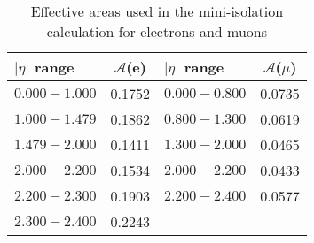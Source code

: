\begin{table}
 \begin{center}
   \small
   \begin{tabular}{lc|lc}
     $|\eta|$ range & $\mathcal{A}$(e) & $|\eta|$ range & $\mathcal{A}$($\mu$)  \\
     \hline
     $0.000-1.000$ & 0.1752 & $0.000-0.800$ & 0.0735 \\
     $1.000-1.479$ & 0.1862 & $0.800-1.300$ & 0.0619 \\
     $1.479-2.000$ & 0.1411 & $1.300-2.000$ & 0.0465 \\
     $2.000-2.200$ & 0.1534 & $2.000-2.200$ & 0.0433 \\
     $2.200-2.300$ & 0.1903 & $2.200-2.400$ & 0.0577 \\
     $2.300-2.400$ & 0.2243 & & \\
   \end{tabular}
   \caption{Effective areas used in the mini-isolation calculation for electrons and muons}
   \label{table:effArea}
 \end{center}
\end{table}
